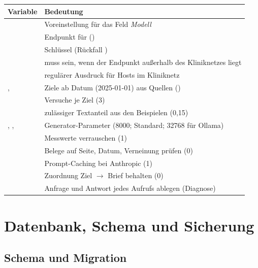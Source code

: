 \documentclass[11pt,a4paper,parskip=half-,headings=standardclasses,toc=bibliography,open=any]{scrreprt}
\newcommand{\feld}[1]{\textsf{\itshape #1}}
\begin{document}
\begin{longtable}{@{}P{6.4cm}p{8.2cm}@{}}
\toprule
\textbf{Variable} & \textbf{Bedeutung}\\
\midrule
\endhead
{} & Voreinstellung für das Feld \feld{Modell}\\
 & Endpunkt für  ()\\
 & Schlüssel (Rückfall )\\
 & muss  sein, wenn der Endpunkt außerhalb des Kliniknetzes liegt\\
 & regulärer Ausdruck für Hosts im Kliniknetz\\
,  & Ziele ab Datum (2025-01-01) aus Quellen ()\\
 & Versuche je Ziel (3)\\
 & zulässiger Textanteil aus den Beispielen (0,15)\\
, ,  & Generator-Parameter (8000; Standard; 32768 für Ollama)\\
 & Messwerte verrauschen (1)\\
 & Belege auf Seite, Datum, Verneinung prüfen (0)\\
 & Prompt-Caching bei Anthropic (1)\\
 & Zuordnung Ziel $\rightarrow$ Brief behalten (0)\\
 & Anfrage und Antwort jedes Aufrufs ablegen (Diagnose)\\
\bottomrule
\end{longtable}

\chapter{Datenbank, Schema und Sicherung}\label{kap:db}

\section{Schema und Migration}
\end{document}
